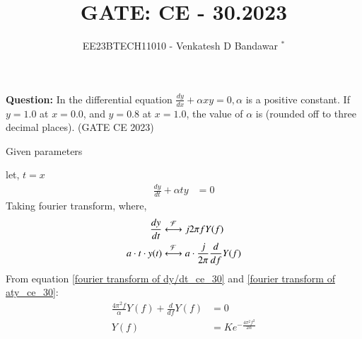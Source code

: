 \documentclass[journal,12pt,twocolumn]{IEEEtran}
\theoremstyle{remark}
\begin{document}

\vspace{3cm}

\title{GATE: CE - 30.2023}
\author{EE23BTECH11010 - Venkatesh D Bandawar $^{*}$%
}
\maketitle
\bigskip


\textbf{Question:} In the differential equation $\frac{dy}{dx} + \alpha x y = 0, \alpha$ is a positive constant. If $y = 1.0$ at
$x = 0.0$, and $y = 0.8$ at $x = 1.0$, the value of $\alpha$ is (rounded off to three decimal places).  \hfill(GATE CE 2023)

\solution
\begin{table}[!h] 
\centering

\caption{Given parameters}
\label{given parameters list.gate.ce.30}
\end{table}



let, $t=x$
\begin{align}
    \frac{dy}{dt} + \alpha t y &= 0
\end{align}
Taking fourier transform,
where,
\begin{align}
    \frac{dy}{dt} & \system{\mathcal{F}} j 2\pi f Y(f) \label{fourier transform of dy/dt_ce_30}\\
    a \cdot t \cdot y(t) & \system{\mathcal{F}} a \cdot \frac{j}{2\pi} \frac{d}{df} Y(f)\label{fourier transform of aty_ce_30}
\end{align}
From equation \eqref{fourier transform of dy/dt_ce_30} and \eqref{fourier transform of aty_ce_30}:
\begin{align}
    \frac{4\pi^2 f}{\alpha} Y(f) + \frac{d}{df} Y(f) &= 0\\
    Y(f) &= K e^{-\frac{4\pi^2 f^2}{2\alpha} }
\end{align}
\end{document}
